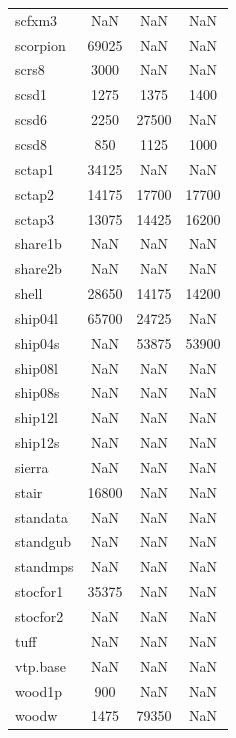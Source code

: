 \begin{longtable}{lccc}
scfxm3   &   NaN &   NaN &    NaN \\
scorpion & 69025 &   NaN &    NaN \\
scrs8    &  3000 &   NaN &    NaN \\
scsd1    &  1275 &  1375 &   1400 \\
scsd6    &  2250 & 27500 &    NaN \\
scsd8    &   850 &  1125 &   1000 \\
sctap1   & 34125 &   NaN &    NaN \\
sctap2   & 14175 & 17700 &  17700 \\
sctap3   & 13075 & 14425 &  16200 \\
share1b  &   NaN &   NaN &    NaN \\
share2b  &   NaN &   NaN &    NaN \\
shell    & 28650 & 14175 &  14200 \\
ship04l  & 65700 & 24725 &    NaN \\
ship04s  &   NaN & 53875 &  53900 \\
ship08l  &   NaN &   NaN &    NaN \\
ship08s  &   NaN &   NaN &    NaN \\
ship12l  &   NaN &   NaN &    NaN \\
ship12s  &   NaN &   NaN &    NaN \\
sierra   &   NaN &   NaN &    NaN \\
stair    & 16800 &   NaN &    NaN \\
standata &   NaN &   NaN &    NaN \\
standgub &   NaN &   NaN &    NaN \\
standmps &   NaN &   NaN &    NaN \\
stocfor1 & 35375 &   NaN &    NaN \\
stocfor2 &   NaN &   NaN &    NaN \\
tuff     &   NaN &   NaN &    NaN \\
vtp.base &   NaN &   NaN &    NaN \\
wood1p   &   900 &   NaN &    NaN \\
woodw    &  1475 & 79350 &    NaN \\
\end{longtable}

